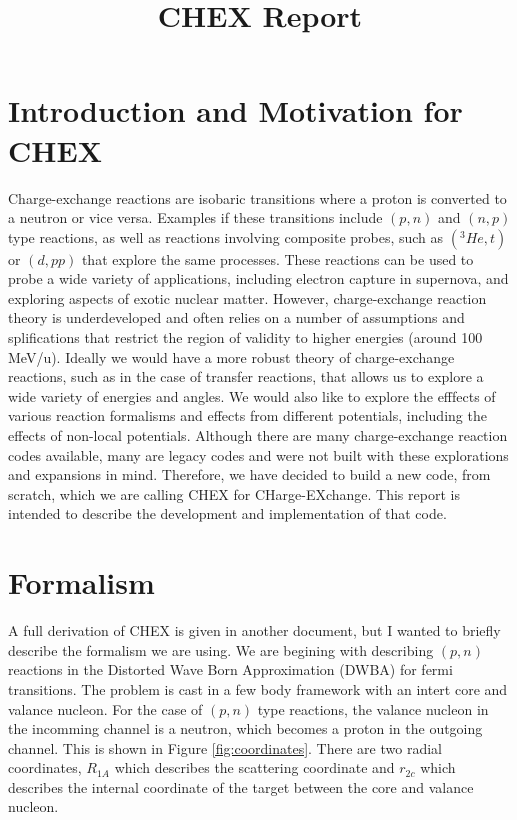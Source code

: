 \documentclass{article}
\title{CHEX Report}
\date{}
\begin{document}
\maketitle
\tableofcontents

\section{Introduction and Motivation for CHEX}

Charge-exchange reactions are isobaric transitions where a proton is converted to a neutron or vice versa.  Examples if these transitions include $(p,n)$ and $(n,p)$ type reactions, as well as reactions involving composite probes, such as $(^3He,t)$ or $(d,pp)$ that explore the same processes.  These reactions can be used to probe a wide variety of applications, including electron capture in supernova, and exploring aspects of exotic nuclear matter.  However, charge-exchange reaction theory is underdeveloped and often relies on a number of assumptions and splifications that restrict the region of validity to higher energies (around 100 MeV/u).  Ideally we would have a more robust theory of charge-exchange reactions, such as in the case of transfer reactions, that allows us to explore a wide variety of energies and angles.  We would also like to explore the efffects of various reaction formalisms and effects from different potentials, including the effects of non-local potentials.  Although there are many charge-exchange reaction codes available, many are legacy codes and were not built with these explorations and expansions in mind.  Therefore, we have decided to build a new code, from scratch, which we are calling CHEX for CHarge-EXchange.  This report is intended to describe the development and implementation of that code.

\section{Formalism}

A full derivation of CHEX is given in another document, but I wanted to briefly describe the formalism we are using.  We are begining with describing $(p,n)$ reactions in the Distorted Wave Born Approximation (DWBA) for fermi transitions.  The problem is cast in a few body framework with an intert core and valance nucleon.  For the case of $(p,n)$ type reactions, the valance nucleon in the incomming channel is a neutron, which becomes a proton in the outgoing channel.  This is shown in Figure \ref{fig:coordinates}.  There are two radial coordinates, $R_{1A}$ which describes the scattering coordinate and $r_{2c}$ which describes the internal coordinate of the target between the core and valance nucleon.
\end{document}
